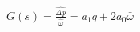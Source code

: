 \begin{equation}
	\begin{split}
		G(s) = \frac{\hat{\Delta p}}{\hat{\omega}} = a_1q + 2a_0\bar{\omega}
	\end{split}
	\label{eq:pumpmodel_lin_taylor}
\end{equation}









